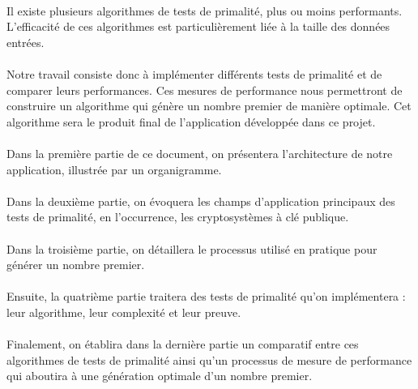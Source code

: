 	\paragraph{}Il existe plusieurs algorithmes de tests de primalité, plus ou moins performants. L'efficacité de ces algorithmes est particulièrement liée à la taille des données entrées. 
	\paragraph{}Notre travail consiste donc à implémenter différents tests de primalité et de comparer leurs performances. Ces mesures de performance nous permettront de construire un algorithme qui génère un nombre premier de manière optimale. Cet algorithme sera le produit final de l'application développée dans ce projet. 
	\paragraph{}Dans la première partie de ce document, on présentera l'architecture de notre application, illustrée par un organigramme.
	\paragraph{}Dans la deuxième partie, on évoquera les champs d'application principaux des tests de primalité, en l'occurrence, les cryptosystèmes à clé publique.
	\paragraph{}Dans la troisième partie, on détaillera le processus utilisé en pratique pour générer un nombre premier.
	\paragraph{}Ensuite, la quatrième partie traitera des tests de primalité qu'on implémentera : leur algorithme, leur complexité et leur preuve.
	\paragraph{}Finalement, on établira dans la dernière partie un comparatif entre ces algorithmes de tests de primalité ainsi qu'un processus de mesure de performance qui aboutira à une génération optimale d'un nombre premier.
	
	
	
	
	
	
	
	

